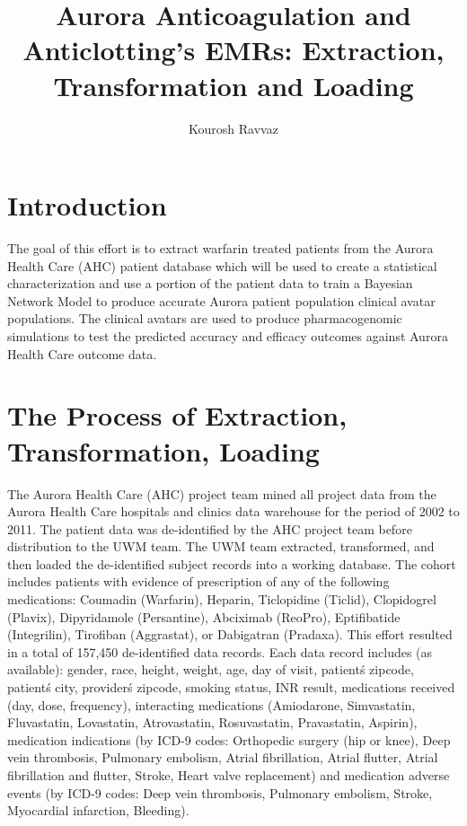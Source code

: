 \documentclass{article}
\begin{document}


\title{Aurora Anticoagulation and Anticlotting's EMRs: 
Extraction, Transformation and Loading}
\author{Kourosh Ravvaz}




\maketitle
\tableofcontents

\section{Introduction}
The goal of this effort is to extract warfarin treated patients from the Aurora Health Care (AHC) patient database which will be used to create a statistical characterization and use a portion of the patient data to train a Bayesian Network Model to produce accurate Aurora patient population clinical avatar populations. The clinical avatars are used to produce pharmacogenomic simulations to test the predicted accuracy and efficacy outcomes against Aurora Health Care outcome data.

\section{The Process of Extraction, Transformation, Loading}
The Aurora Health Care (AHC) project team mined all project data from the Aurora Health Care hospitals and clinics data warehouse for the period of 2002 to 2011. The patient data was de-identified by the AHC project team before distribution to the UWM team.  The UWM team extracted, transformed, and then loaded the de-identified subject records into a working database. The cohort includes patients with evidence of prescription of any of the following medications: Coumadin (Warfarin), Heparin, Ticlopidine (Ticlid), Clopidogrel (Plavix), Dipyridamole (Persantine), Abciximab (ReoPro), Eptifibatide (Integrilin), Tirofiban (Aggrastat), or Dabigatran (Pradaxa).  This effort resulted in a total of 157,450 de-identified data records.  Each data record includes (as available): gender, race, height, weight, age, day of visit, patient\'s zipcode, patient\'s city, provider\'s zipcode, smoking status, INR result, medications received (day, dose, frequency), interacting medications (Amiodarone, Simvastatin, Fluvastatin, Lovastatin, Atrovastatin, Rosuvastatin, Pravastatin, Aspirin), medication indications (by ICD-9 codes: Orthopedic surgery (hip or knee), Deep vein thrombosis, Pulmonary embolism, Atrial fibrillation, Atrial flutter, Atrial fibrillation and flutter, Stroke, Heart valve replacement) and medication adverse events (by ICD-9 codes: Deep vein thrombosis, Pulmonary embolism, Stroke, Myocardial infarction, Bleeding).
\end{document}
